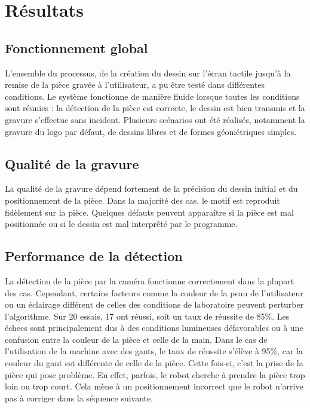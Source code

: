 \chapter{Résultats}

\section{Fonctionnement global}

L'ensemble du processus, de la création du dessin sur l'écran tactile jusqu'à la remise de la pièce gravée à l'utilisateur, a pu être testé dans différentes conditions. Le système fonctionne de manière fluide lorsque toutes les conditions sont réunies : la détection de la pièce est correcte, le dessin est bien transmis et la gravure s'effectue sans incident. Plusieurs scénarios ont été réalisés, notamment la gravure du logo par défaut, de dessins libres et de formes géométriques simples.

\section{Qualité de la gravure}

La qualité de la gravure dépend fortement de la précision du dessin initial et du positionnement de la pièce. Dans la majorité des cas, le motif est reproduit fidèlement sur la pièce. Quelques défauts peuvent apparaître si la pièce est mal positionnée ou si le dessin est mal interprêté par le programme.


\section{Performance de la détection}

La détection de la pièce par la caméra fonctionne correctement dans la plupart des cas. Cependant, certains facteurs comme la couleur de la peau de l'utilisateur ou un éclairage différent de celles des conditions de laboratoire peuvent perturber l'algorithme. Sur 20 essais, 17 ont réussi, soit un taux de réussite de 85\%. Les échecs sont principalement dus à des conditions lumineuses défavorables ou à une confusion entre la couleur de la pièce et celle de la main.
Dans le cas de l'utilisation de la machine avec des gants, le taux de réussite s'élève à 95\%, car la couleur du gant est différente de celle de la pièce. Cette fois-ci, c'est la prise de la pièce qui pose problème. En effet, parfois, le robot cherche à prendre la pièce trop loin ou trop court. Cela mène à un positionnement incorrect que le robot n'arrive pas à corriger dans la séquence suivante.

